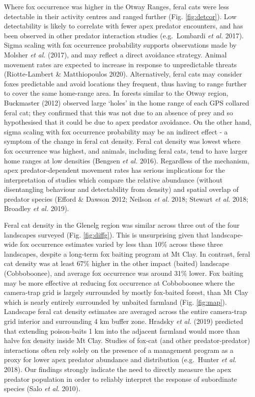 \documentclass[]{elsarticle} %
\begin{document}
Where fox occurrence was higher in the Otway Ranges, feral cats were less detectable in their activity centres and ranged further (Fig. \ref{fig:detcor}). Low detectability is likely to correlate with fewer apex predator encounters, and has been observed in other predator interaction studies (e.g.~Lombardi \emph{et al.} 2017). Sigma scaling with fox occurrence probability supports observations made by Molsher \emph{et al.} (2017), and may reflect a direct avoidance strategy. Animal movement rates are expected to increase in response to unpredictable threats (Riotte-Lambert \& Matthiopoulos 2020). Alternatively, feral cats may consider foxes predictable and avoid locations they frequent, thus having to range further to cover the same home-range area. In forests similar to the Otway region, Buckmaster (2012) observed large `holes' in the home range of each GPS collared feral cat; they confirmed that this was not due to an absence of prey and so hypothesised that it could be due to apex predator avoidance. On the other hand, sigma scaling with fox occurrence probability may be an indirect effect - a symptom of the change in feral cat density. Feral cat density was lowest where fox occurrence was highest, and animals, including feral cats, tend to have larger home ranges at low densities (Bengsen \emph{et al.} 2016). Regardless of the mechanism, apex predator-dependent movement rates has serious implications for the interpretation of studies which compare the relative abundance (without disentangling behaviour and detectability from density) and spatial overlap of predator species (Efford \& Dawson 2012; Neilson \emph{et al.} 2018; Stewart \emph{et al.} 2018; Broadley \emph{et al.} 2019).

Feral cat density in the Glenelg region was similar across three out of the four landscapes surveyed (Fig. \ref{fig:diffg}). This is unsurprising given that landscape-wide fox occurrence estimates varied by less than 10\% across these three landscapes, despite a long-term fox baiting program at Mt Clay. In contrast, feral cat density was at least 67\% higher in the other impact (baited) landscape (Cobboboonee), and average fox occurrence was around 31\% lower. Fox baiting may be more effective at reducing fox occurrence at Cobboboonee where the camera-trap grid is largely surrounded by mostly fox-baited forest, than Mt Clay which is nearly entirely surrounded by unbaited farmland (Fig. \ref{fig:map}). Landscape feral cat density estimates are averaged across the entire camera-trap grid interior and surrounding 4 km buffer zone. Hradsky \emph{et al.} (2019) predicted that extending poison-baits 1 km into the adjacent farmland would more than halve fox density inside Mt Clay. Studies of fox-cat (and other predator-predator) interactions often rely solely on the presence of a management program as a proxy for lower apex predator abundance and distribution (e.g.~Hunter \emph{et al.} 2018). Our findings strongly indicate the need to directly measure the apex predator population in order to reliably interpret the response of subordinate species (Salo \emph{et al.} 2010).
\end{document}
